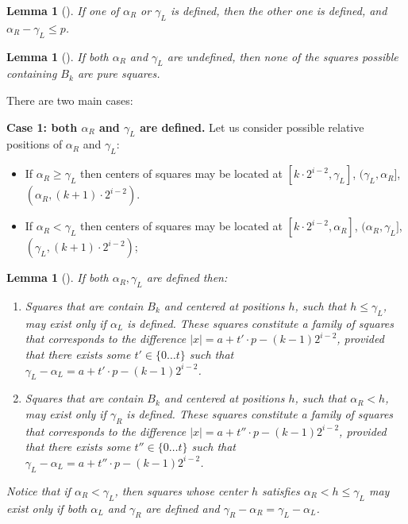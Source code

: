 \documentclass[11pt]{article}
\theoremstyle{break}
\newtheorem{lem}[thm]{Lemma}
\begin{document}
\begin{lem}[{\rm\cite{2}}]
If one of $\alpha_R$ or $\gamma_L$ is defined, then the other one is defined, and $\alpha_R - \gamma_L \leq p$.
\end{lem}

\begin{lem}[{\rm\cite{2}}]
If both $\alpha_R$ and $\gamma_L$ are undefined, then none of the squares possible containing $B_k$ are pure
squares.
\end{lem}

There are two main cases:

\noindent \textbf{Case 1: both {\boldmath $\alpha_R$} and {\boldmath $\gamma_L$} are defined.} Let us consider
possible relative positions of $\alpha_R$ and $\gamma_L$:
\begin{itemize}
\item If $\alpha_R \geq \gamma_L$ then centers of squares may be located at $[k \cdot 2^{i-2}, \gamma_L]$, $(\gamma_L, \alpha_R]$,
$(\alpha_R, (k+1)\cdot2^{i-2})$.

\item If $\alpha_R < \gamma_L$ then centers of squares may be located at $[k \cdot 2^{i-2}, \alpha_R]$, $(\alpha_R, \gamma_L]$,
$(\gamma_L, (k+1)\cdot2^{i-2})$;
\end{itemize}

\begin{lem}[{\rm\cite{2}}]
If both $\alpha_R, \gamma_L$ are defined then:

\begin{enumerate}
\item Squares that are contain $B_k$ and centered at positions $h$, such that $h \leq \gamma_L$, may exist only if
$\alpha_L$ is defined. These squares constitute a family of squares that corresponds to the difference
$|x| = a + t'\cdot p - (k-1)2^{i-2}$, provided that there exists some $t' \in \{0\dots t\}$ such that
$\gamma_L - \alpha_L = a + t'\cdot p - (k-1)2^{i-2}$.
\item Squares that are contain $B_k$ and centered at positions $h$, such that $\alpha_R < h$, may exist only if
$\gamma_R$ is defined. These squares constitute a family of squares that corresponds to the difference
$|x| = a + t''\cdot p - (k-1)2^{i-2}$, provided that there exists some $t'' \in \{0\dots t\}$ such that
$\gamma_L - \alpha_L = a + t''\cdot p - (k-1)2^{i-2}$.
\end{enumerate}
Notice that if $\alpha_R < \gamma_L$, then squares whose center $h$ satisfies $\alpha_R < h \leq\gamma_L$ may
exist only if both $\alpha_L$ and $\gamma_R$ are defined and $\gamma_R - \alpha_R = \gamma_L - \alpha_L$.
\label{lem:simple_squares}
\end{lem}
\end{document}

